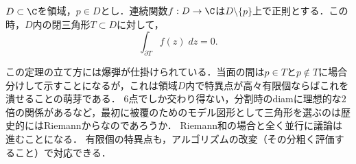 \documentclass[uplatex, dvipdfmx]{jsreport}
\begin{document}
\begin{theorem}[三角形に対するCauchyの定理]\label{thm-Cauchy's-theorem-for-triangle}
    $D\subset\C$を領域，$p\in D$とし．連続関数$f:D\to\C$は$D\setminus\{p\}$上で正則とする．この時，$D$内の閉三角形$T\subset D$に対して，
    \[ \int_{\partial T}f(z)\;dz=0. \]
\end{theorem}
\begin{remark}
    この定理の立て方には爆弾が仕掛けられている．当面の間は$p\in T$と$p\notin T$に場合分けして示すことになるが，これは領域$D$内で特異点が高々有限個ならばこれを潰せることの萌芽である．
    6点でしか交わり得ない，分割時のdiamに理想的な$2$倍の関係があるなど，最初に被覆のためのモデル図形として三角形を選ぶのは歴史的にはRiemannからなのであろうか．
    Riemann和の場合と全く並行に議論は進むことになる．
    有限個の特異点も，アルゴリズムの改変（その分粗く評価すること）で対応できる．
\end{remark}
\end{document}
